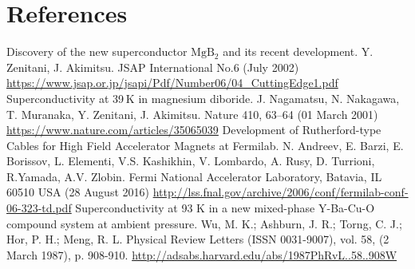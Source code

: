 \documentclass{comjnl}
\newcommand*\chem[1]{\ensuremath{\mathrm{#1}}}
\begin{document}
\section{References}
\begingroup
\renewcommand{\section}[2]{}
\begin{thebibliography}{}
  Discovery of the new superconductor \chem{MgB_2} and its recent development. 
  Y. Zenitani, J. Akimitsu. 
  JSAP International No.6 (July 2002)
  \url{https://www.jsap.or.jp/jsapi/Pdf/Number06/04_CuttingEdge1.pdf}
  Superconductivity at 39 K in magnesium diboride. 
  J. Nagamatsu, N. Nakagawa, T. Muranaka, Y. Zenitani, J. Akimitsu. 
  Nature 410, 63–64 (01 March 2001)
  \url{https://www.nature.com/articles/35065039}
  Development of Rutherford-type Cables for High Field Accelerator Magnets at Fermilab.
  N. Andreev, E. Barzi, E. Borissov, L. Elementi, V.S. Kashikhin, V. Lombardo, A. Rusy, D. Turrioni, 
R.Yamada, A.V. Zlobin.
   Fermi  National  Accelerator  Laboratory,  Batavia, IL 60510 USA (28 August 2016)
  \url{http://lss.fnal.gov/archive/2006/conf/fermilab-conf-06-323-td.pdf}
  Superconductivity at 93 K in a new mixed-phase Y-Ba-Cu-O compound system at ambient pressure.
  Wu, M. K.; Ashburn, J. R.; Torng, C. J.; Hor, P. H.; Meng, R. L.
  Physical Review Letters (ISSN 0031-9007), vol. 58, (2 March 1987), p. 908-910.
  \url{http://adsabs.harvard.edu/abs/1987PhRvL..58..908W}
\end{thebibliography}
\endgroup
\nocite{*}



\end{document}

